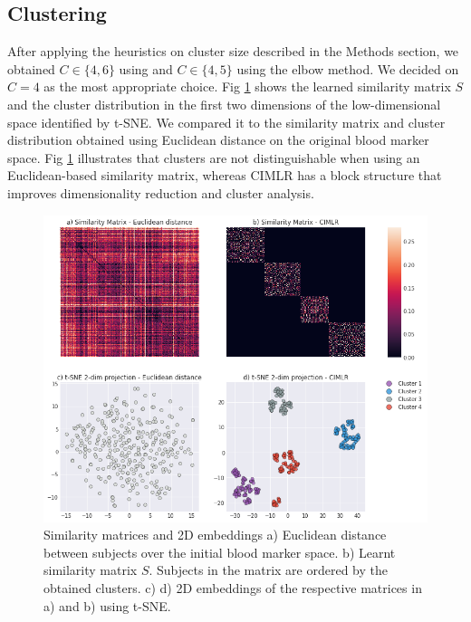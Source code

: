 \subsection{Clustering}

After applying the heuristics on cluster size described in the Methods section, we obtained $C\in\{4,6\}$ using  \cite{Zelnik-Manor} and $C\in\{4,5\}$ using the elbow method. We decided on $C=4$ as the most appropriate choice. Fig \ref{figclusters} shows the learned similarity matrix $S$ and the cluster distribution in the first two dimensions of the low-dimensional space identified by t-SNE. We compared it to the similarity matrix and cluster distribution obtained using Euclidean distance on the original blood marker space. Fig \ref{figclusters} illustrates that clusters are not distinguishable when using an Euclidean-based similarity matrix, whereas CIMLR has a block structure that improves dimensionality reduction and cluster analysis. \\

\begin{figure}[!htbp]
  \centering
\includegraphics[width=1.0\textwidth]{figures/cimlr/cluster_results_full.png}
\caption[Similarity matrices and 2D embeddings.]{Similarity matrices and 2D embeddings a) Euclidean distance between subjects over the initial blood marker space. b) Learnt similarity matrix $S$. Subjects in the matrix are ordered by the obtained clusters. c) d) 2D embeddings of the respective matrices in a) and b) using t-SNE.}
\label{figclusters}
\end{figure}

